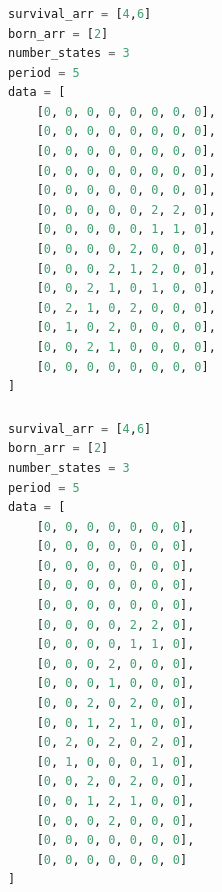 \documentclass[12pt]{article}
\numberwithin{figure}{section} %
\begin{document}
\noindent\begin{minipage}{.50\textwidth}
\subsubsection{}
\begin{lstlisting}[language = Python]
survival_arr = [4,6]
born_arr = [2]
number_states = 3
period = 5
data = [
    [0, 0, 0, 0, 0, 0, 0, 0],
    [0, 0, 0, 0, 0, 0, 0, 0],
    [0, 0, 0, 0, 0, 0, 0, 0],
    [0, 0, 0, 0, 0, 0, 0, 0],
    [0, 0, 0, 0, 0, 0, 0, 0],
    [0, 0, 0, 0, 0, 2, 2, 0],
    [0, 0, 0, 0, 0, 1, 1, 0],
    [0, 0, 0, 0, 2, 0, 0, 0],
    [0, 0, 0, 2, 1, 2, 0, 0],
    [0, 0, 2, 1, 0, 1, 0, 0],
    [0, 2, 1, 0, 2, 0, 0, 0],
    [0, 1, 0, 2, 0, 0, 0, 0],
    [0, 0, 2, 1, 0, 0, 0, 0],
    [0, 0, 0, 0, 0, 0, 0, 0]
]
\end{lstlisting}
\end{minipage}\hfill
\begin{minipage}{.45\textwidth}
\subsubsection{}
\begin{lstlisting}[language = Python]
survival_arr = [4,6]
born_arr = [2]
number_states = 3
period = 5
data = [
    [0, 0, 0, 0, 0, 0, 0],
    [0, 0, 0, 0, 0, 0, 0],
    [0, 0, 0, 0, 0, 0, 0],
    [0, 0, 0, 0, 0, 0, 0],
    [0, 0, 0, 0, 0, 0, 0],
    [0, 0, 0, 0, 2, 2, 0],
    [0, 0, 0, 0, 1, 1, 0],
    [0, 0, 0, 2, 0, 0, 0],
    [0, 0, 0, 1, 0, 0, 0],
    [0, 0, 2, 0, 2, 0, 0],
    [0, 0, 1, 2, 1, 0, 0],
    [0, 2, 0, 2, 0, 2, 0],
    [0, 1, 0, 0, 0, 1, 0],
    [0, 0, 2, 0, 2, 0, 0],
    [0, 0, 1, 2, 1, 0, 0],
    [0, 0, 0, 2, 0, 0, 0],
    [0, 0, 0, 0, 0, 0, 0],
    [0, 0, 0, 0, 0, 0, 0]
]
\end{lstlisting}
\end{minipage}
\end{document}
